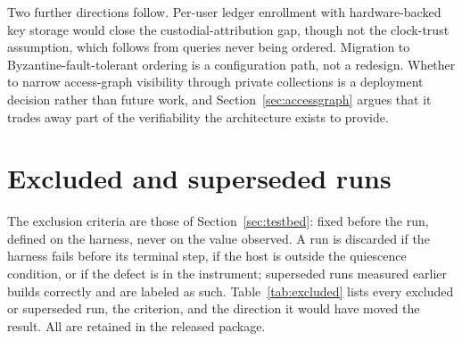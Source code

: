 \documentclass[preprint,12pt]{elsarticle}
\begin{document}
Two further directions follow. Per-user ledger enrollment with
hardware-backed key storage would close the custodial-attribution gap, though
not the clock-trust assumption, which follows from queries never being
ordered. Migration to Byzantine-fault-tolerant ordering is a configuration
path, not a redesign. Whether to narrow
access-graph visibility through private collections is a deployment decision
rather than future work, and Section~\ref{sec:accessgraph} argues that it
trades away part of the verifiability the architecture exists to provide.



\appendix
\section{Excluded and superseded runs}
\label{app:excluded}

The exclusion criteria are those of Section~\ref{sec:testbed}: fixed before
the run, defined on the harness, never on the value observed. A run is
discarded if the harness fails before its terminal step, if the host is
outside the quiescence condition, or if the defect is in the instrument;
superseded runs measured earlier builds correctly and are labeled as such.
Table~\ref{tab:excluded} lists every excluded or superseded run, the
criterion, and the direction it would have moved the result. All are retained
in the released package.
\end{document}
